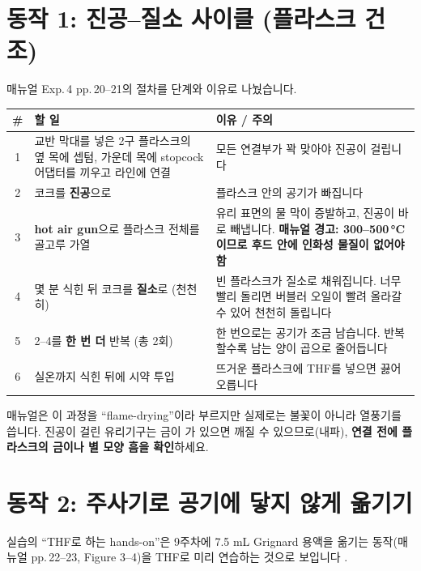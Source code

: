 \documentclass[10pt,a4paper]{article}
\begin{document}
\section{동작 1: 진공--질소 사이클 (플라스크 건조)}
매뉴얼 Exp.\,4 pp.\,20--21의 절차를 단계와 이유로 나눴습니다.

\renewcommand{\arraystretch}{1.3}
\begin{tabularx}{\linewidth}{|c|X|X|}
\hline
\textbf{\#} & \textbf{할 일} & \textbf{이유 / 주의} \\ \hline
1 & 교반 막대를 넣은 2구 플라스크의 옆 목에 셉텀, 가운데 목에 stopcock 어댑터를 끼우고 라인에 연결 & 모든 연결부가 꽉 맞아야 진공이 걸립니다 \\ \hline
2 & 코크를 \textbf{진공}으로 & 플라스크 안의 공기가 빠집니다 \\ \hline
3 & \textbf{hot air gun}으로 플라스크 전체를 골고루 가열 & 유리 표면의 물 막이 증발하고, 진공이 바로 빼냅니다. \textbf{매뉴얼 경고: 300--500\,\si{\celsius}이므로 후드 안에 인화성 물질이 없어야 함} \\ \hline
4 & 몇 분 식힌 뒤 코크를 \textbf{질소}로 (천천히) & 빈 플라스크가 질소로 채워집니다. 너무 빨리 돌리면 버블러 오일이 빨려 올라갈 수 있어 천천히 돌립니다 \\ \hline
5 & 2--4를 \textbf{한 번 더} 반복 (총 2회) & 한 번으로는 공기가 조금 남습니다. 반복할수록 남는 양이 곱으로 줄어듭니다 \\ \hline
6 & 실온까지 식힌 뒤에 시약 투입 & 뜨거운 플라스크에 THF를 넣으면 끓어오릅니다 \\ \hline
\end{tabularx}
\renewcommand{\arraystretch}{1}
{\small 매뉴얼은 이 과정을 ``flame-drying''이라 부르지만 실제로는 불꽃이 아니라 열풍기를 씁니다. 진공이 걸린 유리기구는 금이 가 있으면 깨질 수 있으므로(내파), \textbf{연결 전에 플라스크의 금이나 별 모양 흠을 확인}하세요.}

\section{동작 2: 주사기로 공기에 닿지 않게 옮기기}
실습의 ``THF로 하는 hands-on''은 9주차에 7.5 mL Grignard 용액을 옮기는 동작(매뉴얼 pp.\,22--23, Figure 3--4)을 THF로 미리 연습하는 것으로 보입니다 .
\end{document}

